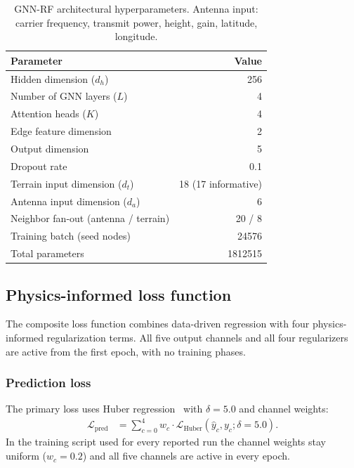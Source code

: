 \documentclass{ieeeaccess}
\begin{document}
\begin{table}[!t]
\centering
\caption{GNN-RF architectural hyperparameters. Antenna input: carrier frequency, transmit power, height, gain, latitude, longitude.}
\label{tab:model_config}
\begin{tabular}{lr}
\toprule
Parameter & Value \\
\midrule
Hidden dimension ($d_h$) & 256 \\
Number of GNN layers ($L$) & 4 \\
Attention heads ($K$) & 4 \\
Edge feature dimension & 2 \\
Output dimension & 5 \\
Dropout rate & 0.1 \\
Terrain input dimension ($d_t$) & 18 (17 informative) \\
Antenna input dimension ($d_a$) & 6 \\
Neighbor fan-out (antenna / terrain) & 20 / 8 \\
Training batch (seed nodes) & \num{24576} \\
Total parameters & \num{1812515} \\
\bottomrule
\end{tabular}
\end{table}

\subsection{Physics-informed loss function}
\label{sec:loss_function}

The composite loss function combines data-driven regression with four physics-informed regularization terms. All five output channels and all four regularizers are active from the first epoch, with no training phases.

\subsubsection{Prediction loss}

The primary loss uses Huber regression~\cite{huber1964robust} with $\delta{=}5.0$ and channel weights:
\begin{equation}
\begin{aligned}
\mathcal{L}_{\text{pred}} &= \sum_{c=0}^{4} w_c \cdot \mathcal{L}_{\text{Huber}}(\hat{y}_c, y_c; \delta{=}5.0).
\end{aligned}
\label{eq:loss_pred}
\end{equation}
In the training script used for every reported run the channel weights stay uniform ($w_c = 0.2$) and all five channels are active in every epoch.
\end{document}
